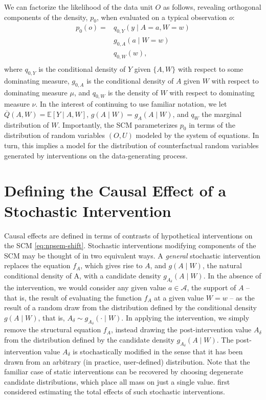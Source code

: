 \documentclass[
  12pt, krantz2,
]{krantz}
\newcommand{\E}{\mathbb{E}}
\newcommand{\1}{\mathbbm{1}}
\theoremstyle{definition}
\theoremstyle{definition}
\theoremstyle{definition}
\theoremstyle{definition}
\theoremstyle{remark}
\begin{document}
We can factorize the likelihood of the data unit \(O\) as follows, revealing
orthogonal components of the density, \(p_0\), when evaluated on a typical
observation \(o\):
\begin{align}
  p_0(o) = &q_{0,Y}(y \mid A = a, W = w) \\ \nonumber
    &g_{0,A}(a \mid W = w) \\ \nonumber
    &q_{0,W}(w),\\ \nonumber
  \label{eq:likelihood-factorization-shift}
\end{align}
where \(q_{0, Y}\) is the conditional density of \(Y\) given \(\{A, W\}\) with respect
to some dominating measure, \(g_{0, A}\) is the conditional density of \(A\) given
\(W\) with respect to dominating measure \(\mu\), and \(q_{0, W}\) is the density of
\(W\) with respect to dominating measure \(\nu\). In the interest of continuing to
use familiar notation, we let \(\overline{Q}(A, W) = \E[Y \mid A, W]\), \(g(A \mid W) = g_{A}(A \mid W)\), and \(q_W\) the marginal distribution of \(W\). Importantly,
the SCM parameterizes \(p_0\) in terms of the distribution of random variables
\((O, U)\) modeled by the system of equations. In turn, this implies a model for
the distribution of counterfactual random variables generated by interventions
on the data-generating process.

\hypertarget{defining-the-causal-effect-of-a-stochastic-intervention}{%
\section{Defining the Causal Effect of a Stochastic Intervention}\label{defining-the-causal-effect-of-a-stochastic-intervention}}

Causal effects are defined in terms of contrasts of hypothetical interventions
on the SCM \eqref{eq:npsem-shift}. Stochastic interventions modifying
components of the SCM may be thought of in two equivalent ways. A \emph{general}
stochastic intervention replaces the equation \(f_A\), which gives rise to \(A\),
and \(g(A \mid W)\), the natural conditional density of A, with a candidate
density \(g_{A_{\delta}}(A \mid W)\). In the absence of the intervention, we would
consider any given value \(a \in \mathcal{A}\), the support of \(A\) -- that is, the
result of evaluating the function \(f_A\) at a given value \(W = w\) -- as the
result of a random draw from the distribution defined by the conditional density
\(g(A \mid W)\), that is, \(A_{\delta} \sim g_{A_{\delta}}(\cdot \mid W)\). In
applying the intervention, we simply remove the structural equation \(f_A\),
instead drawing the post-intervention value \(A_{\delta}\) from the distribution
defined by the candidate density \(g_{A_{\delta}}(A \mid W)\). The
post-intervention value \(A_{\delta}\) is stochastically modified in the sense
that it has been drawn from an arbitrary (in practice, user-defined)
distribution. Note that the familiar case of static interventions can be
recovered by choosing degenerate candidate distributions, which place all mass
on just a single value. \citet{stock1989nonparametric} first considered estimating the
total effects of such stochastic interventions.
\end{document}

